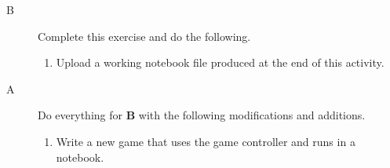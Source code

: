 \pagebreak

\analysis

\begin{description}

\item[B] Complete this exercise and do the following.

\begin{enumerate}
	\item Upload a working notebook file produced at the end of this activity.
\end{enumerate}


\item[A] Do everything for {\bf B} with the following modifications and additions.

\begin{enumerate}
	\item Write a new game that uses the game controller and runs in a notebook.
\end{enumerate}




\end{description}

